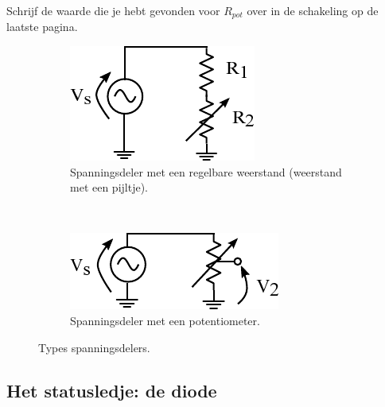 \documentclass{article}
\begin{document}
			Schrijf de waarde die je hebt gevonden voor $R_{pot}$ over in de schakeling op de laatste pagina.
			\begin{figure}
				\centering
				\begin{subfigure}[b]{0.45\linewidth}
					\centering
					\includegraphics{regelbareR}
					\caption{Spanningsdeler met een regelbare weerstand (weerstand met een pijltje).}
					\label{subfig:regelbareR}
				\end{subfigure}
				~
				\begin{subfigure}[b]{0.45\linewidth}
					\centering
					\includegraphics{potentiometer.pdf}
					\caption{Spanningsdeler met een potentiometer.}
					\label{subfig:pot}
				\end{subfigure}
			\caption{Types spanningsdelers.}
			\label{fig:vdeler} 
			\end{figure}

		\subsection{Het statusledje: de diode}
\end{document}
